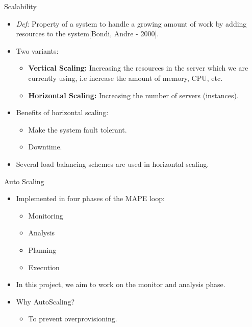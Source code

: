 \documentclass{beamer}
\begin{document}
\begin{frame}{Scalability}
    \begin{itemize}
        
        \item \textit{Def:} Property of a system to handle a growing amount of work by adding resources
            to the system[Bondi, Andre - 2000].
        
        \item Two variants:
            \begin{itemize}
                
                \item \textbf{Vertical Scaling:} Increasing the resources in the
                        server which we are currently using, i.e increase the amount of memory, CPU, etc.
                
                \item \textbf{Horizontal Scaling:} Increasing the number of servers (instances).
            \end{itemize}
        
        \item Benefits of horizontal scaling:
            \begin{itemize}
                
                \item Make the system fault tolerant.
                
                \item Downtime.
            \end{itemize}
        
        \item Several load balancing schemes are used in horizontal scaling.
    \end{itemize}
\end{frame}


\begin{frame}{Auto Scaling}
\begin{itemize}
    
    \item Implemented in four phases of the MAPE loop:
        \begin{itemize}
            
            \item Monitoring
            \item Analysis
            \item Planning
            \item Execution
        \end{itemize}
    \item In this project, we aim to work on the monitor and analysis phase.
    \item Why AutoScaling?
        \begin{itemize}
            \item To prevent overprovisioning.
        \end{itemize}
\end{itemize}
\end{frame}
\end{document}
